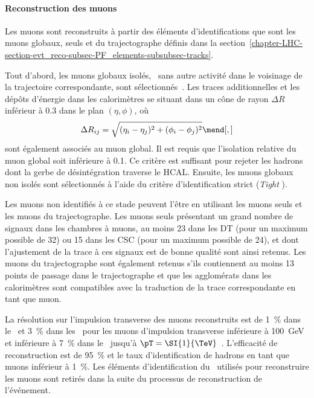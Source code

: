 \paragraph{Reconstruction des muons}
Les muons sont reconstruits à partir des éléments d'identifications que sont les muons globaux, seuls et du trajectographe définis dans la section~\ref{chapter-LHC-section-evt_reco-subsec-PF_elements-subsubsec-tracks}.
\par Tout d'abord, les muons globaux isolés, \ie\ sans autre activité dans le voisinage de la trajectoire correspondante, sont sélectionnés~\cite{particle-flow}.
Les traces additionnelles et les dépôts d'énergie dans les calorimètres se situant dans un cône de rayon $\Delta R$ inférieur à \num{0.3} dans le plan $(\eta,\phi)$, où
\begin{equation}
\Delta R_{ij} = \sqrt{(\eta_i-\eta_j)^2 + (\phi_i-\phi_j)^2}
\mend[,]
\end{equation}
sont également associés au muon global.
Il est requis que l'isolation relative du muon global soit inférieure à \num{0.1}.
Ce critère est suffisant pour rejeter les hadrons dont la gerbe de désintégration traverse le HCAL.
Ensuite, les muons globaux non isolés sont sélectionnés à l'aide du critère d'identification strict (\emph{Tight} \muonID).
\par Les muons non identifiés à ce stade peuvent l'être en utilisant les muons seuls et les muons du trajectographe.
Les muons seuls présentant un grand nombre de signaux dans les chambres à muons, au moins 23 dans les DT (pour un maximum possible de 32) ou 15 dans les CSC (pour un maximum possible de 24), et dont l'ajustement de la trace à ces signaux est de bonne qualité sont ainsi retenus.
Les muons du trajectographe sont également retenus s'ils contiennent au moins 13 points de passage dans le trajectographe et que les agglomérats dans les calorimètres sont compatibles avec la traduction de la trace correspondante en tant que muon.
\par La résolution sur l'impulsion transverse des muons reconstruits est de \SI{1}{\%} dans le \CMSbarrel\ et \SI{3}{\%} dans les \CMSendcaps\ pour les muons d'impulsion transverse inférieure à \SI{100}{\GeV}
et inférieure à \SI{7}{\%} dans le \CMSbarrel\ jusqu'à $\pT=\SI{1}{\TeV}$~\cite{CMS-MUO-16-001}.
L'efficacité de reconstruction est de \SI{95}{\%} et le taux d'identification de hadrons en tant que muons inférieur à \SI{1}{\%}.
Les éléments d'identification du \PF\ utilisés pour reconstruire les muons sont retirés dans la suite du processus de reconstruction de l'événement.
